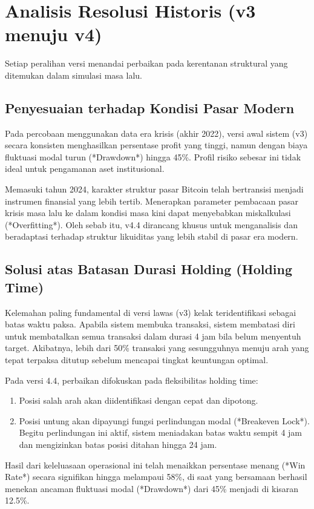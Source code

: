 \documentclass[a4paper,11pt]{article}
\begin{document}
\section{Analisis Resolusi Historis (v3 menuju v4)}
Setiap peralihan versi menandai perbaikan pada kerentanan struktural yang ditemukan dalam simulasi masa lalu.

\subsection{Penyesuaian terhadap Kondisi Pasar Modern}
Pada percobaan menggunakan data era krisis (akhir 2022), versi awal sistem (v3) secara konsisten menghasilkan persentase profit yang tinggi, namun dengan biaya fluktuasi modal turun (*Drawdown*) hingga 45\%. Profil risiko sebesar ini tidak ideal untuk pengamanan aset institusional.

Memasuki tahun 2024, karakter struktur pasar Bitcoin telah bertransisi menjadi instrumen finansial yang lebih tertib. Menerapkan parameter pembacaan pasar krisis masa lalu ke dalam kondisi masa kini dapat menyebabkan miskalkulasi (*Overfitting*). Oleh sebab itu, v4.4 dirancang khusus untuk menganalisis dan beradaptasi terhadap struktur likuiditas yang lebih stabil di pasar era modern.

\subsection{Solusi atas Batasan Durasi Holding (Holding Time)}
Kelemahan paling fundamental di versi lawas (v3) kelak teridentifikasi sebagai batas waktu paksa. Apabila sistem membuka transaksi, sistem membatasi diri untuk membatalkan semua transaksi dalam durasi 4 jam bila belum menyentuh target. Akibatnya, lebih dari 50\% transaksi yang sesungguhnya menuju arah yang tepat terpaksa ditutup sebelum mencapai tingkat keuntungan optimal.

Pada versi 4.4, perbaikan difokuskan pada fleksibilitas holding time:
\begin{enumerate}
    \item Posisi salah arah akan diidentifikasi dengan cepat dan dipotong.
    \item Posisi untung akan dipayungi fungsi perlindungan modal (*Breakeven Lock*). Begitu perlindungan ini aktif, sistem meniadakan batas waktu sempit 4 jam dan mengizinkan batas posisi ditahan hingga 24 jam.
\end{enumerate}
Hasil dari keleluasaan operasional ini telah menaikkan persentase menang (*Win Rate*) secara signifikan hingga melampaui 58\%, di saat yang bersamaan berhasil menekan ancaman fluktuasi modal (*Drawdown*) dari 45\% menjadi di kisaran 12.5\%.
\end{document}
